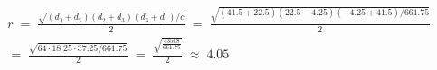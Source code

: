 \documentclass[12pt, a4paper]{article}
\begin{document}
			\begin{gather*}
				\begin{aligned}
					r\;=\;\frac{
						\sqrt{(d_1+d_2)(d_2+d_3)(d_3+d_1)/c}
					}{
						2				
					}\;=\;\frac{
						\sqrt{
							(41.5+22.5)(22.5-4.25)
							(-4.25+41.5)/661.75
						}
					}{
						2
					}\\
					=\;\frac{
						\sqrt{64\cdot18.25\cdot37.25/661.75}
					}{2}\;=\;\frac{
						\sqrt{\frac{43508}{661.75}}
					}{2}\;\approx\;4.05
				\end{aligned}
			\end{gather*}
\end{document}
